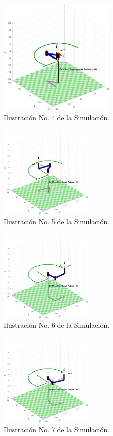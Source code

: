 \documentclass[final]{foresj}
\begin{document}
\begin{figure}[h!]
\centering
\includegraphics[width=0.5\textwidth]{G3.png}
\caption{Ilustración No. 4 de la Simulación.}
\label{fig:my_label}
\end{figure}

\begin{figure}[h!]
\centering
\includegraphics[width=0.4\textwidth]{G4.png}
\caption{Ilustración No. 5 de la Simulación.}
\label{fig:my_label}
\end{figure}

\begin{figure}[h!]
\centering
\includegraphics[width=0.4\textwidth]{G5.png}
\caption{Ilustración No. 6 de la Simulación.}
\label{fig:my_label}
\end{figure}

\begin{figure}[h!]
\centering
\includegraphics[width=0.4\textwidth]{GH0.png}
\caption{Ilustración No. 7 de la Simulación.}
\label{fig:my_label}
\end{figure}
\end{document}
